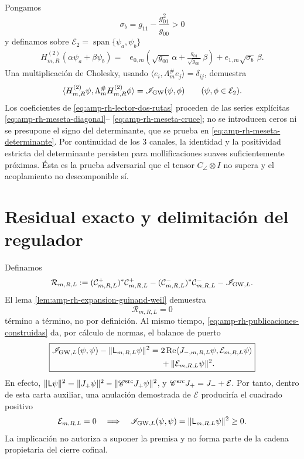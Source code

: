 Pongamos
\[
 \sigma_b=g_{11}-\frac{g_{01}^2}{g_{00}}>0
\]
y definamos sobre
\(\mathcal E_2=\operatorname{span}\{\psi_a,\psi_b\}\)
\begin{align}
 H^{(2)}_{m,R}(\alpha\psi_a+\beta\psi_b)
 ={}&
 e_{0,m}\left(
 \sqrt{g_{00}}\,\alpha
 +\frac{g_{01}}{\sqrt{g_{00}}}\,\beta\right)
 +e_{1,m}\sqrt{\sigma_b}\,\beta .
 \label{eq:amp-rh-lector-dos-rutas}
\end{align}
Una multiplicación de Cholesky, usando
\(\langle e_i,\Lambda_m^\#e_j\rangle=\delta_{ij}\), demuestra
\begin{equation}\label{eq:amp-rh-meseta-energia-exacta}
 \langle H^{(2)}_{m,R}\psi,
         \Lambda_m^\#H^{(2)}_{m,R}\phi\rangle
 =\mathscr I_{\rm GW}(\psi,\phi)
 \qquad(\psi,\phi\in\mathcal E_2).
\end{equation}
Los coeficientes de \eqref{eq:amp-rh-lector-dos-rutas} proceden de las
series explícitas
\eqref{eq:amp-rh-meseta-diagonal}--
\eqref{eq:amp-rh-meseta-cruce}; no se introducen ceros ni se presupone el
signo del determinante, que se prueba en
\eqref{eq:amp-rh-meseta-determinante}. Por continuidad de los \(3\)
canales, la identidad y la positividad estricta del determinante persisten
para mollificaciones suaves suficientemente próximas. Ésta es la prueba
adversarial que el tensor \(C_\angle\otimes I\) no supera y el acoplamiento
no descomponible sí.

\section*{Residual exacto y delimitación del regulador}

Definamos
\begin{equation}\label{eq:amp-rh-residual-finito}
 \mathcal R_{m,R,L}
 :=
 (\mathcal C^+_{m,R,L})^*\mathcal C^+_{m,R,L}
 -(\mathcal C^-_{m,R,L})^*\mathcal C^-_{m,R,L}
 -\mathscr I_{{\rm GW},L}.
\end{equation}
El lema \ref{lem:amp-rh-expansion-guinand-weil} demuestra
\[
 \mathcal R_{m,R,L}=0
\]
término a término, no por definición. Al mismo tiempo,
\eqref{eq:amp-rh-publicaciones-construidas} da, por cálculo de normas, el
balance de puerto
\begin{equation}\label{eq:amp-rh-balance-residual-puerto}
 \boxed{
 \begin{aligned}
 \mathscr I_{{\rm GW},L}(\psi,\psi)
 -\|\mathsf L_{m,R,L}\psi\|^2
 ={}&2\operatorname{Re}
 \langle J_{-,m,R,L}\psi,\mathcal E_{m,R,L}\psi\rangle\\
 &+\|\mathcal E_{m,R,L}\psi\|^2 .
 \end{aligned}}
\end{equation}
En efecto,
\(\|\mathsf L\psi\|^2
=\|J_+\psi\|^2-\|\mathscr C^{\rm src}J_+\psi\|^2\), y
\(\mathscr C^{\rm src}J_+=J_-+\mathcal E\). Por tanto, dentro de esta carta
auxiliar, una anulación demostrada de \(\mathcal E\) produciría el cuadrado positivo
\begin{equation}\label{eq:amp-rh-cuadrado-regulado}
 \mathcal E_{m,R,L}=0
 \quad\Longrightarrow\quad
 \mathscr I_{{\rm GW},L}(\psi,\psi)
 =\|\mathsf L_{m,R,L}\psi\|^2\geq0.
\end{equation}
La implicación no autoriza a suponer la premisa y no forma parte de la cadena
propietaria del cierre cofinal.

